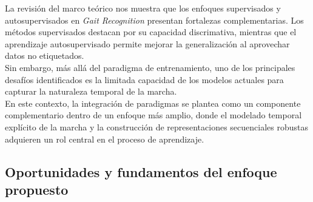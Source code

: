 La revisión del marco teórico nos muestra que los enfoques supervisados y autosupervisados en \textit{Gait Recognition} presentan fortalezas complementarias. Los métodos supervisados destacan por su capacidad discrimativa, mientras que el aprendizaje autosupervisado permite mejorar la generalización al aprovechar datos no etiquetados. \\
Sin embargo, más allá del paradigma de entrenamiento, uno de los principales desafíos identificados es la limitada capacidad de los modelos actuales para capturar la naturaleza temporal de la marcha. \\
En este contexto, la integración de paradigmas se plantea como un componente complementario dentro de un enfoque más amplio, donde el modelado temporal explícito de la marcha y la construcción de representaciones secuenciales robustas adquieren un rol central en el proceso de aprendizaje.

\subsection{Oportunidades y fundamentos del enfoque propuesto}

